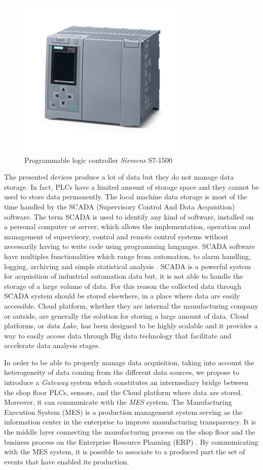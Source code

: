 \begin{figure}
\centerline{\includegraphics[scale=1]{images/chapter_3/PLC.jpg}}
\caption{Programmable logic controller \textit{Siemens} S7-1500}
\label{fig:plc}
\end{figure}


The presented devices produce a lot of data but they do not manage data storage. In fact, PLCs have a limited amount of storage space and they cannot be used to store data permanently. The local machine data storage is most of the time handled by the SCADA (Supervisory Control And Data Acquisition) software. The term SCADA is used to identify any kind of software, installed on a personal computer or server, which allows the implementation, operation and management of supervisory, control and remote control systems without necessarily having to write code using programming languages. SCADA software have multiples functionalities which range from automation, to alarm handling, logging, archiving and simple statistical analysis \citep{daneels1999scada}. SCADA is a powerful system for acquisition of industrial automation data but, it is not able to handle the storage of a large volume of data. For this reason the collected data through SCADA system should be stored elsewhere, in a place where data are easily accessible. Cloud platform, whether they are internal the manufacturing company or outside, are generally the solution for storing a large amount of data. Cloud platforms, or \textit{data Lake}, has been designed to be highly scalable and it provides a way to easily access data through Big data technology that facilitate and accelerate data analysis stages.  

In order to be able to properly manage data acquisition, taking into account the heterogeneity of data coming from the different data sources, we propose to introduce a \textit{Gateway} system which constitutes an intermediary bridge between the shop floor PLCs, sensors, and the Cloud platform where data are stored. Moreover, it can communicate with the \textit{MES} system. The Manufacturing Execution System (MES) is a production management system serving as the information center in the enterprise to improve manufacturing transparency. It is the middle layer connecting the manufacturing process on the shop floor and the business process on the Enterprise Resource Planning (ERP) \citep{chen2020implementation}. By communicating with the MES system, it is possible to associate to a produced part the set of events that have enabled its production.

